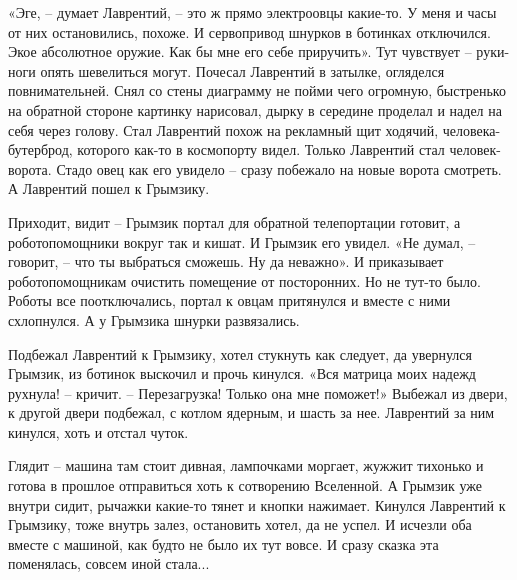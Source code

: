 \documentclass[ebook,oneside,final,openright]{memoir}
\begin{document}
\par
«Эге, – думает Лаврентий, – это ж прямо электроовцы какие-то. У меня и часы от них остановились, похоже. И сервопривод шнурков в ботинках отключился. Экое абсолютное оружие. Как бы мне его себе приручить». Тут чувствует – руки-ноги опять шевелиться могут. Почесал Лаврентий в затылке, огляделся повнимательней. Снял со стены диаграмму не пойми чего огромную, быстренько на обратной стороне картинку нарисовал, дырку в середине проделал и надел на себя через голову. Стал Лаврентий похож на рекламный щит ходячий, человека-бутерброд, которого как-то в космопорту видел. Только Лаврентий стал человек-ворота. Стадо овец как его увидело – сразу побежало на новые ворота смотреть. А Лаврентий пошел к Грымзику.\par
\par
Приходит, видит – Грымзик портал для обратной телепортации готовит, а роботопомощники вокруг так и кишат. И Грымзик его увидел. «Не думал, – говорит, – что ты выбраться сможешь. Ну да неважно». И приказывает роботопомощникам очистить помещение от посторонних. Но не тут-то было. Роботы все поотключались, портал к овцам притянулся и вместе с ними схлопнулся. А у Грымзика шнурки развязались.\par
\par
Подбежал Лаврентий к Грымзику, хотел стукнуть как следует, да увернулся Грымзик, из ботинок выскочил и прочь кинулся. «Вся матрица моих надежд рухнула! – кричит. – Перезагрузка! Только она мне поможет!» Выбежал из двери, к другой двери подбежал, с котлом ядерным, и шасть за нее. Лаврентий за ним кинулся, хоть и отстал чуток.\par
\par
Глядит – машина там стоит дивная, лампочками моргает, жужжит тихонько и готова в прошлое отправиться хоть к сотворению Вселенной. А Грымзик уже внутри сидит, рычажки какие-то тянет и кнопки нажимает. Кинулся Лаврентий к Грымзику, тоже внутрь залез, остановить хотел, да не успел. И исчезли оба вместе с машиной, как будто не было их тут вовсе. И сразу сказка эта поменялась, совсем иной стала...\par
\end{document}
